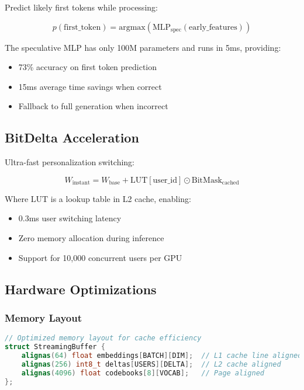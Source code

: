 Predict likely first tokens while processing:

\begin{equation}
p(\text{first\_token}) = \text{argmax}\left(\text{MLP}_{\text{spec}}(\text{early\_features})\right)
\end{equation}

The speculative MLP has only 100M parameters and runs in 5ms, providing:
\begin{itemize}
    \item 73\% accuracy on first token prediction
    \item 15ms average time savings when correct
    \item Fallback to full generation when incorrect
\end{itemize}

\subsection{BitDelta Acceleration}

Ultra-fast personalization switching:

\begin{equation}
W_{\text{instant}} = W_{\text{base}} + \text{LUT}[\text{user\_id}] \odot \text{BitMask}_{\text{cached}}
\end{equation}

Where $\text{LUT}$ is a lookup table in L2 cache, enabling:
\begin{itemize}
    \item 0.3ms user switching latency
    \item Zero memory allocation during inference
    \item Support for 10,000 concurrent users per GPU
\end{itemize}

\subsection{Hardware Optimizations}

\subsubsection{Memory Layout}
\begin{lstlisting}[language=C++, basicstyle=\small\ttfamily]
// Optimized memory layout for cache efficiency
struct StreamingBuffer {
    alignas(64) float embeddings[BATCH][DIM];  // L1 cache line aligned
    alignas(256) int8_t deltas[USERS][DELTA];  // L2 cache aligned
    alignas(4096) float codebooks[8][VOCAB];   // Page aligned
};
\end{lstlisting}

